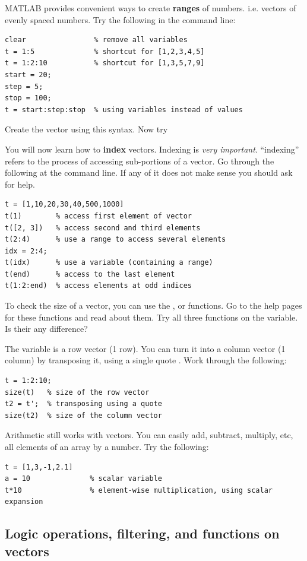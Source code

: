 \documentclass{article}
\begin{document}
MATLAB provides convenient ways to create \textbf{ranges} of numbers. i.e. vectors of evenly spaced numbers.
Try the following in the command line:
\begin{lstlisting}
clear                % remove all variables
t = 1:5              % shortcut for [1,2,3,4,5]
t = 1:2:10           % shortcut for [1,3,5,7,9]
start = 20;
step = 5;
stop = 100;
t = start:step:stop  % using variables instead of values
\end{lstlisting}
Create the vector \mcode{[5,8,11,14]} using this syntax. Now try \mcode{[-1,-2,-3,-4]}

You will now learn how to \textbf{index} vectors.
Indexing is \emph{very important}.
``indexing'' refers to the process of accessing sub-portions of a vector.
Go through the following at the command line.
If any of it does not make sense you should ask for help.
\begin{lstlisting}
t = [1,10,20,30,40,500,1000]
t(1)        % access first element of vector
t([2, 3])   % access second and third elements
t(2:4)      % use a range to access several elements
idx = 2:4;
t(idx)      % use a variable (containing a range)
t(end)      % access to the last element
t(1:2:end)  % access elements at odd indices
\end{lstlisting}

To check the size of a vector, you can use the ,  or  functions.
Go to the help pages for these functions and read about them. 
Try all three functions on the  variable. Is their any difference?

\pagebreak
The variable  is a row vector (1 row).
You can turn it into a column vector (1 column) by transposing it, using a single quote .
Work through the following:
\begin{lstlisting}
t = 1:2:10;
size(t)   % size of the row vector
t2 = t';  % transposing using a quote
size(t2)  % size of the column vector
\end{lstlisting}

Arithmetic still works with vectors.
You can easily add, subtract, multiply, etc, all elements of an array by a number.
Try the following:
\begin{lstlisting}
t = [1,3,-1,2.1]
a = 10              % scalar variable
t*10                % element-wise multiplication, using scalar expansion
\end{lstlisting}

\subsection{Logic operations, filtering, and functions on vectors}
\end{document}
